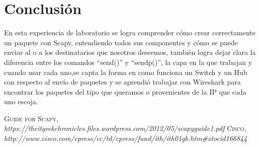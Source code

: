 \documentclass{udpreport}
\begin{document}
 	     
	      

\chapter{Conclusión}
  	      En esta experiencia de laboratorio se logra comprender cómo crear correctamente un paquete con Scapy,
  	      entendiendo todos sus componentes y cómo se puede enviar al o a los destinatarios que nosotros deseemos, también
  	      logra dejar clara la diferencia entre los comandos “send()” y “sendp()”, la capa en la que trabajan y cuando usar cada
  	      uno,se capta la forma en como funciona un Switch y un Hub con respecto al envío de paquetes y se aprendió trabajar con
  	      Wireshark para encontrar los paquetes del tipo que queramos o provenientes de la IP que cada uno  escoja.
\begin{thebibliography}{x}
 \textsc{Guide for Scapy},
\textit{https://theitgeekchronicles.files.wordpress.com/2012/05/scapyguide1.pdf}
 \textsc{Cisco},
\textit{ http://www.cisco.com/cpress/cc/td/cpress/fund/ith/ith01gb.htm#xtocid166844}
\end{thebibliography}
\end{document}
